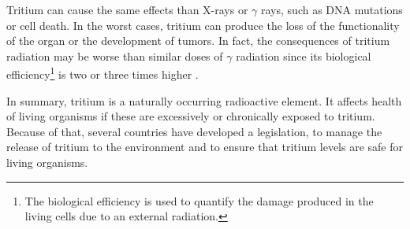 Tritium can cause the same effects than X-rays or $\gamma$ rays, such as DNA mutations or cell death. In the worst cases, tritium can produce the loss of the functionality of the organ or the development of tumors. In fact, the consequences of tritium radiation may be worse than similar doses of $\gamma$ radiation since its biological efficiency\footnote{The biological efficiency is used to quantify the damage produced in the living cells due to an external radiation.} is two or three times higher \cite{StraumeTritiumHazard}.


In summary, tritium is a naturally occurring radioactive element. It affects health of living organisms if these are excessively or chronically exposed to tritium. Because of that, several countries have developed a legislation, to manage the release of tritium to the environment and to ensure that tritium levels are safe for living organisms.




